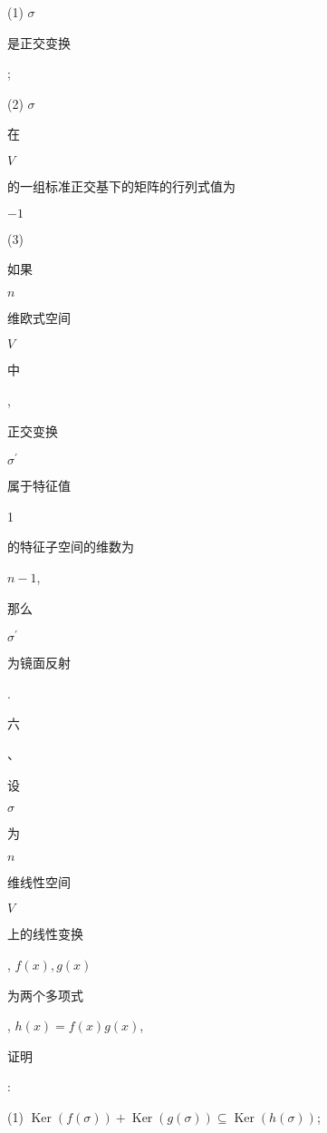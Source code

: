 \documentclass[10pt]{article}
\begin{document}
(1) $\sigma$ \begin{CJK}{UTF8}{mj}是正交变换\end{CJK};

(2) $\sigma$ \begin{CJK}{UTF8}{mj}在\end{CJK} $V$ \begin{CJK}{UTF8}{mj}的一组标准正交基下的矩阵的行列式值为\end{CJK} $-1$

(3) \begin{CJK}{UTF8}{mj}如果\end{CJK} $n$ \begin{CJK}{UTF8}{mj}维欧式空间\end{CJK} $V$ \begin{CJK}{UTF8}{mj}中\end{CJK}, \begin{CJK}{UTF8}{mj}正交变换\end{CJK} $\sigma^{\prime}$ \begin{CJK}{UTF8}{mj}属于特征值\end{CJK} 1 \begin{CJK}{UTF8}{mj}的特征子空间的维数为\end{CJK} $n-1$, \begin{CJK}{UTF8}{mj}那么\end{CJK} $\sigma^{\prime}$ \begin{CJK}{UTF8}{mj}为镜面反射\end{CJK}.

\begin{CJK}{UTF8}{mj}六\end{CJK}、\begin{CJK}{UTF8}{mj}设\end{CJK} $\sigma$ \begin{CJK}{UTF8}{mj}为\end{CJK} $n$ \begin{CJK}{UTF8}{mj}维线性空间\end{CJK} $V$ \begin{CJK}{UTF8}{mj}上的线性变换\end{CJK}, $f(x), g(x)$ \begin{CJK}{UTF8}{mj}为两个多项式\end{CJK}, $h(x)=f(x) g(x)$, \begin{CJK}{UTF8}{mj}证明\end{CJK}:

(1) $\operatorname{Ker}(f(\sigma))+\operatorname{Ker}(g(\sigma)) \subseteq \operatorname{Ker}(h(\sigma))$;
\end{document}
